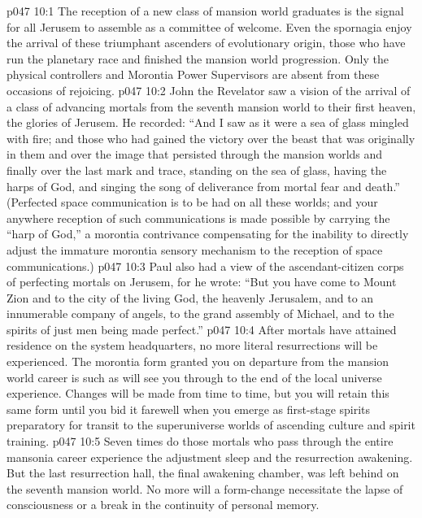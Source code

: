 \vs p047 10:1 The reception of a new class of mansion world graduates is the signal for all Jerusem to assemble as a committee of welcome. Even the spornagia enjoy the arrival of these triumphant ascenders of evolutionary origin, those who have run the planetary race and finished the mansion world progression. Only the physical controllers and Morontia Power Supervisors are absent from these occasions of rejoicing.
\vs p047 10:2 \pc John the Revelator saw a vision of the arrival of a class of advancing mortals from the seventh mansion world to their first heaven, the glories of Jerusem. He recorded: “And I saw as it were a sea of glass mingled with fire; and those who had gained the victory over the beast that was originally in them and over the image that persisted through the mansion worlds and finally over the last mark and trace, standing on the sea of glass, having the harps of God, and singing the song of deliverance from mortal fear and death.” (Perfected space communication is to be had on all these worlds; and your anywhere reception of such communications is made possible by carrying the “harp of God,” a morontia contrivance compensating for the inability to directly adjust the immature morontia sensory mechanism to the reception of space communications.)
\vs p047 10:3 Paul also had a view of the ascendant\hyp{}citizen corps of perfecting mortals on Jerusem, for he wrote: “But you have come to Mount Zion and to the city of the living God, the heavenly Jerusalem, and to an innumerable company of angels, to the grand assembly of Michael, and to the spirits of just men being made perfect.”
\vs p047 10:4 \pc After mortals have attained residence on the system headquarters, no more literal resurrections will be experienced. The morontia form granted you on departure from the mansion world career is such as will see you through to the end of the local universe experience. Changes will be made from time to time, but you will retain this same form until you bid it farewell when you emerge as first\hyp{}stage spirits preparatory for transit to the superuniverse worlds of ascending culture and spirit training.
\vs p047 10:5 Seven times do those mortals who pass through the entire mansonia career experience the adjustment sleep and the resurrection awakening. But the last resurrection hall, the final awakening chamber, was left behind on the seventh mansion world. No more will a form\hyp{}change necessitate the lapse of consciousness or a break in the continuity of personal memory.

